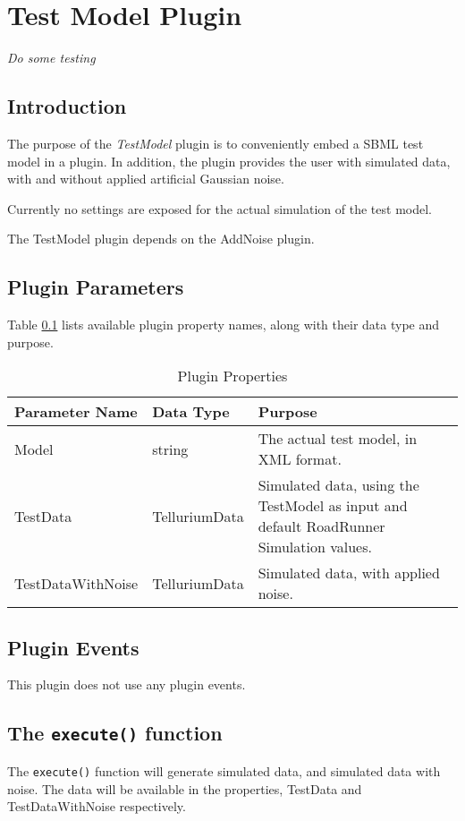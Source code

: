 \chapter*{Test Model Plugin}
\setcounter{chapter}{1}
\emph{Do some testing}
\section{Introduction}
The purpose of the \emph{TestModel} plugin is to conveniently embed a SBML test model in a plugin. In addition, the plugin provides the user with simulated data, with and without applied artificial Gaussian noise. 

Currently no settings are exposed for the actual simulation of the test model.

The TestModel plugin depends on the AddNoise plugin.
 
\section{Plugin Parameters}
Table \ref{table:PluginProperties} lists available plugin property names, along with their data type and purpose.


\begin{table}[ht]
\centering %
\begin{tabular}{l l p{7.5cm}} %

Parameter Name & Data Type & Purpose \\ [0.5ex] %
\hline %
Model         			& 	string 				& The actual test model, in XML format. \\
TestData      			& 	TelluriumData    	& Simulated data, using the TestModel as input and default RoadRunner Simulation values. \\
TestDataWithNoise    	& 	TelluriumData  	    & Simulated data, with applied noise. \\

\hline %
\end{tabular}
\caption{Plugin Properties} 
\label{table:PluginProperties} 
\end{table}

\section{Plugin Events}
This plugin does not use any plugin events.


\section{The \texttt{execute()} function}
The \verb|execute()| function will generate simulated data, and simulated data with noise. The data will be available in the properties, TestData and TestDataWithNoise respectively. 

